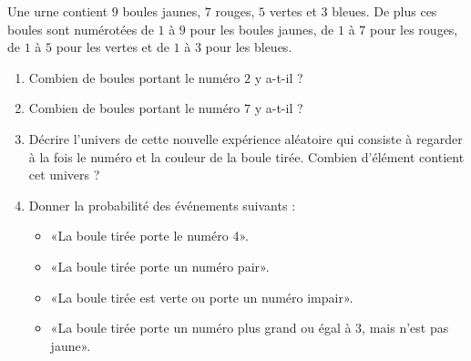 
\begin{exercice}\label{exosmath-0190}

    Une urne contient \( 9\) boules jaunes, \( 7\) rouges, \( 5\) vertes et \( 3\) bleues. De plus ces boules sont numérotées de \( 1\) à \( 9\) pour les boules jaunes,  de \( 1\) à \( 7\) pour les rouges, de \( 1\) à \( 5\) pour les vertes et de \( 1\) à \( 3\) pour les bleues.

    \begin{enumerate}
        \item
            Combien de boules portant le numéro \( 2\) y a-t-il ?
        \item
            Combien de boules portant le numéro \( 7\) y a-t-il ?
        \item
            Décrire l'univers de cette nouvelle expérience aléatoire qui consiste à regarder à la fois le numéro et la couleur de la boule tirée. Combien d'élément contient cet univers ?
        \item
            Donner la probabilité des événements suivants :
            \begin{itemize}
                \item «La boule tirée porte le numéro 4».
                \item
                    «La boule tirée porte un numéro pair». 
                \item
                    «La boule tirée est verte ou porte un numéro impair».
                \item
                    «La boule tirée porte un numéro plus grand ou égal à \( 3\), mais n'est pas jaune».
            \end{itemize}
    \end{enumerate}

\end{exercice}
